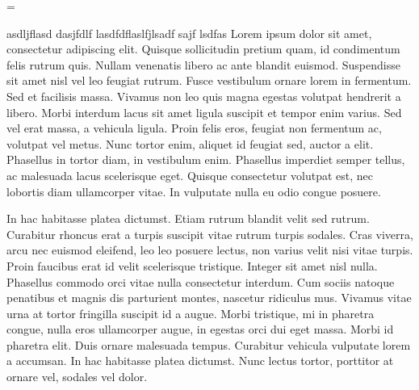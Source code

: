 \output={\lastrule} %

\def\makerule#1/{
  \edef\theprevdepth{\the\prevdepth}%
  \nointerlineskip%
  \vbox to 0pt{\hrule height 0pt\vskip -#1 %
        \hbox to 0pt{%
          \leftoffset=\leftskip \advance\leftoffset by -10pt%
          \kern\leftoffset \vrule height#1 depth-1ex width1pt%
          \hss}}%
  \prevdepth=\theprevdepth}

\startrule 
asdljflasd dasjfdlf lasdfdflaslfjlsadf sajf lsdfas Lorem ipsum dolor
sit amet, consectetur adipiscing elit. Quisque sollicitudin pretium
quam, id condimentum felis rutrum quis. Nullam venenatis libero ac
ante blandit euismod. Suspendisse sit amet nisl vel leo feugiat
rutrum. Fusce vestibulum ornare lorem in fermentum. Sed et facilisis
massa. Vivamus non leo quis magna egestas volutpat hendrerit a
libero. Morbi interdum lacus sit amet ligula suscipit et tempor enim
varius. Sed vel erat massa, a vehicula ligula. Proin felis eros,
feugiat non fermentum ac, volutpat vel metus. Nunc tortor enim,
aliquet id feugiat sed, auctor a elit. Phasellus in tortor diam, in
vestibulum enim. Phasellus imperdiet semper tellus, ac malesuada lacus
scelerisque eget. Quisque consectetur volutpat est, nec lobortis diam
ullamcorper vitae. In vulputate nulla eu odio congue posuere.

In hac habitasse platea dictumst. Etiam rutrum blandit velit sed
rutrum. Curabitur rhoncus erat a turpis suscipit vitae rutrum turpis
sodales. Cras viverra, arcu nec euismod eleifend, leo leo posuere
lectus, non varius velit nisi vitae turpis. Proin faucibus erat id
velit scelerisque tristique. Integer sit amet nisl nulla. Phasellus
commodo orci vitae nulla consectetur interdum. Cum sociis natoque
penatibus et magnis dis parturient montes, nascetur ridiculus
mus. Vivamus vitae urna at tortor fringilla suscipit id a augue. Morbi
tristique, mi in pharetra congue, nulla eros ullamcorper augue, in
egestas orci dui eget massa. Morbi id pharetra elit. Duis ornare
malesuada tempus. Curabitur vehicula vulputate lorem a accumsan. In
hac habitasse platea dictumst. Nunc lectus tortor, porttitor at ornare
vel, sodales vel dolor.
\endrule

